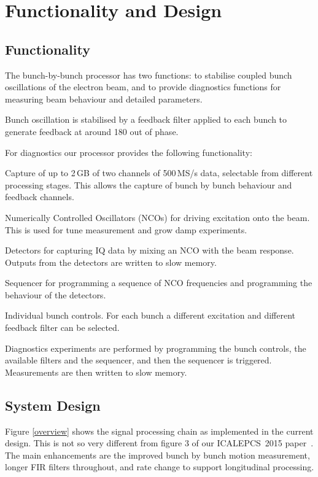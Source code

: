 \documentclass[
    a4paper,
    keeplastbox,            %
    hyphens,                %
    nospread,               %
]{jacow}
\begin{document}
\section{Functionality and Design}

\subsection{Functionality}

The bunch-by-bunch processor has two functions: to stabilise coupled bunch
oscillations of the electron beam, and to provide diagnostics functions for
measuring beam behaviour and detailed parameters.

Bunch oscillation is stabilised by a feedback filter applied to each bunch to
generate feedback at around 180\textdegree{} out of phase.

For diagnostics our processor provides the following functionality:
\begin{Itemize}
\item
    Capture of up to 2\,GB of two channels of 500\,MS/s data, selectable from
    different processing stages.  This allows the capture of bunch by bunch
    behaviour and feedback channels.
\item
    Numerically Controlled Oscillators (NCOs) for driving excitation
    onto the beam.  This is used for tune measurement and grow damp experiments.
\item
    Detectors for capturing IQ data by mixing an NCO with the beam response.
    Outputs from the detectors are written to slow memory.
\item
    Sequencer for programming a sequence of NCO frequencies and programming the
    behaviour of the detectors.
\item
    Individual bunch controls.  For each bunch a different excitation and
    different feedback filter can be selected.
\end{Itemize}

Diagnostics experiments are performed by programming the bunch controls, the
available filters and the sequencer, and then the sequencer is triggered.
Measurements are then written to slow memory.


\subsection{System Design}

Figure \ref{overview} shows the signal processing chain as implemented in the
current design.  This is not so very different from figure 3 of our
ICALEPCS~2015 paper~\cite{icalepcs2015}.  The main enhancements are the improved
bunch by bunch motion measurement, longer FIR filters throughout, and rate
change to support longitudinal processing.
\end{document}
